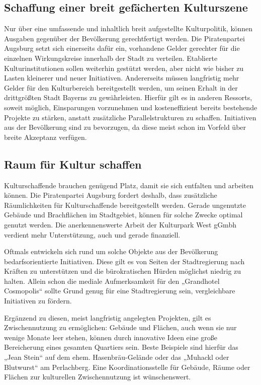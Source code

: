   \subsection{Schaffung einer breit gefächerten Kulturszene}
  
  Nur über eine umfassende und inhaltlich breit aufgestellte Kulturpolitik,
  können Ausgaben gegenüber der Bevölkerung gerechtfertigt werden. Die 
  Piratenpartei Augsburg setzt sich einerseits dafür ein, vorhandene Gelder 
  gerechter für die einzelnen Wirkungskreise innerhalb der Stadt zu 
  verteilen. Etablierte Kulturinstitutionen sollen weiterhin gestützt werden, 
  aber nicht wie bisher zu Lasten kleinerer und neuer Initiativen. 
  Andererseits müssen langfristig mehr Gelder für den Kulturbereich 
  bereitgestellt werden, um seinen Erhalt in der drittgrößten Stadt Bayerns 
  zu gewährleisten. Hierfür gilt es in anderen Ressorts, soweit möglich, 
  Einsparungen vorzunehmen und kosteneffizient bereits bestehende Projekte zu 
  stärken, anstatt zusätzliche Parallelstrukturen zu schaffen. Initiativen 
  aus der Bevölkerung sind zu bevorzugen, da diese meist schon im Vorfeld 
  über breite Akzeptanz verfügen.
  
  \subsection{Raum für Kultur schaffen}
  
  Kulturschaffende brauchen genügend Platz, damit sie sich entfalten und 
  arbeiten können. Die Piratenpartei Augsburg fordert deshalb, dass 
  zusätzliche Räumlichkeiten für Kulturschaffende bereitgestellt werden. 
  Gerade ungenutzte Gebäude und Brachflächen im Stadtgebiet, können für solche 
  Zwecke optimal genutzt werden. Die anerkennenswerte Arbeit der Kulturpark 
  West gGmbh verdient mehr Unterstützung, auch und gerade finanziell.
  
  Oftmals entwickeln sich rund um solche Objekte aus der Bevölkerung 
  bedarfsorientierte Initiativen. Diese gilt es von Seiten der Stadtregierung 
  nach Kräften zu unterstützen und die bürokratischen Hürden möglichst 
  niedrig zu halten. Allein schon die mediale Aufmerksamkeit für den 
  „Grandhotel Cosmopolis“ sollte Grund genug für eine Stadtregierung sein, 
  vergleichbare Initiativen zu fördern.
  
  Ergänzend zu diesen, meist langfristig angelegten Projekten, gilt es 
  Zwischennutzung zu ermöglichen: Gebäude und Flächen, auch wenn sie nur 
  wenige Monate leer stehen, können durch innovative Ideen eine große 
  Bereicherung eines gesamten Quartiers sein. Beste Beispiele sind hierfür 
  das „Jean Stein“ auf dem ehem. Hasenbräu-Gelände oder das „Muhackl oder 
  Blutwurst“ am Perlachberg. Eine Koordinationsstelle für Gebäude, Räume oder 
  Flächen zur kulturellen Zwischennutzung ist wünschenswert.
  
